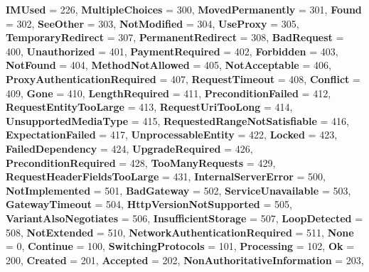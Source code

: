 \begin{DoxyCompactItemize}
{\bfseries I\+M\+Used} = 226, 
{\bfseries Multiple\+Choices} = 300, 
{\bfseries Moved\+Permanently} = 301, 
\newline
{\bfseries Found} = 302, 
{\bfseries See\+Other} = 303, 
{\bfseries Not\+Modified} = 304, 
{\bfseries Use\+Proxy} = 305, 
\newline
{\bfseries Temporary\+Redirect} = 307, 
{\bfseries Permanent\+Redirect} = 308, 
{\bfseries Bad\+Request} = 400, 
{\bfseries Unauthorized} = 401, 
\newline
{\bfseries Payment\+Required} = 402, 
{\bfseries Forbidden} = 403, 
{\bfseries Not\+Found} = 404, 
{\bfseries Method\+Not\+Allowed} = 405, 
\newline
{\bfseries Not\+Acceptable} = 406, 
{\bfseries Proxy\+Authentication\+Required} = 407, 
{\bfseries Request\+Timeout} = 408, 
{\bfseries Conflict} = 409, 
\newline
{\bfseries Gone} = 410, 
{\bfseries Length\+Required} = 411, 
{\bfseries Precondition\+Failed} = 412, 
{\bfseries Request\+Entity\+Too\+Large} = 413, 
\newline
{\bfseries Request\+Uri\+Too\+Long} = 414, 
{\bfseries Unsupported\+Media\+Type} = 415, 
{\bfseries Requested\+Range\+Not\+Satisfiable} = 416, 
{\bfseries Expectation\+Failed} = 417, 
\newline
{\bfseries Unprocessable\+Entity} = 422, 
{\bfseries Locked} = 423, 
{\bfseries Failed\+Dependency} = 424, 
{\bfseries Upgrade\+Required} = 426, 
\newline
{\bfseries Precondition\+Required} = 428, 
{\bfseries Too\+Many\+Requests} = 429, 
{\bfseries Request\+Header\+Fields\+Too\+Large} = 431, 
{\bfseries Internal\+Server\+Error} = 500, 
\newline
{\bfseries Not\+Implemented} = 501, 
{\bfseries Bad\+Gateway} = 502, 
{\bfseries Service\+Unavailable} = 503, 
{\bfseries Gateway\+Timeout} = 504, 
\newline
{\bfseries Http\+Version\+Not\+Supported} = 505, 
{\bfseries Variant\+Also\+Negotiates} = 506, 
{\bfseries Insufficient\+Storage} = 507, 
{\bfseries Loop\+Detected} = 508, 
\newline
{\bfseries Not\+Extended} = 510, 
{\bfseries Network\+Authentication\+Required} = 511, 
{\bfseries None} = 0, 
{\bfseries Continue} = 100, 
\newline
{\bfseries Switching\+Protocols} = 101, 
{\bfseries Processing} = 102, 
{\bfseries Ok} = 200, 
{\bfseries Created} = 201, 
\newline
{\bfseries Accepted} = 202, 
{\bfseries Non\+Authoritative\+Information} = 203, 

\end{DoxyCompactItemize}
